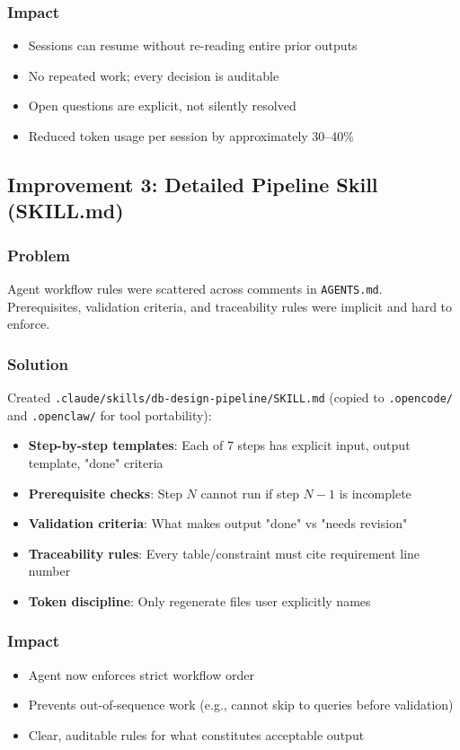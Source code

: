 \documentclass[12pt,a4paper]{article}
\begin{document}
\subsubsection{Impact}
\begin{itemize}
    \item Sessions can resume without re-reading entire prior outputs
    \item No repeated work; every decision is auditable
    \item Open questions are explicit, not silently resolved
    \item Reduced token usage per session by approximately 30--40\%
\end{itemize}

\subsection{Improvement 3: Detailed Pipeline Skill (SKILL.md)}

\subsubsection{Problem}
Agent workflow rules were scattered across comments in \texttt{AGENTS.md}. Prerequisites, validation criteria, and traceability rules were implicit and hard to enforce.

\subsubsection{Solution}
Created \texttt{.claude/skills/db-design-pipeline/SKILL.md} (copied to \texttt{.opencode/} and \texttt{.openclaw/} for tool portability):

\begin{itemize}
    \item \textbf{Step-by-step templates}: Each of 7 steps has explicit input, output template, "done" criteria
    \item \textbf{Prerequisite checks}: Step $N$ cannot run if step $N-1$ is incomplete
    \item \textbf{Validation criteria}: What makes output "done" vs "needs revision"
    \item \textbf{Traceability rules}: Every table/constraint must cite requirement line number
    \item \textbf{Token discipline}: Only regenerate files user explicitly names
\end{itemize}

\subsubsection{Impact}
\begin{itemize}
    \item Agent now enforces strict workflow order
    \item Prevents out-of-sequence work (e.g., cannot skip to queries before validation)
    \item Clear, auditable rules for what constitutes acceptable output
\end{itemize}
\end{document}
